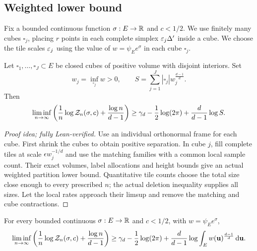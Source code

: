 \documentclass[11pt,letterpaper]{article}
\begin{document}
\subsection{Weighted lower bound}
Fix a bounded continuous function $\sigma:E\to\mathbb R$ and $c<1/2$.
We use finitely many cubes $\square_j$, placing $r$ points in each complete simplex $\varepsilon_j\Delta'$ inside a cube. We choose the tile scales $\varepsilon_{j}$ using the value of $w=\psi_Ee^\sigma$ in each cube $\square_{j}$.


\begin{lemma}\label{lem:cube-lower}
      Let $\square_1,\ldots,\square_J\subset E$ be closed cubes of positive volume with disjoint interiors. Set
      \[
            w_j=\inf_{\square_j}w>0,\qquad S=\sum_{j=1}^J|\square_j|w_j^{\frac{d-1}{d}}.
      \]
      Then
      \begin{equation}\label{eq:lower-rate}
            \liminf_{n\to\infty}\left(\frac1n\log\mathcal Z_n(\sigma,c)+\frac{\log n}{d-1}\right)
            \ge\gamma_d-\frac12\log(2\pi)+\frac d{d-1}\log S.
      \end{equation}
\end{lemma}

\begin{proof}[Proof idea; fully Lean-verified]
Use an individual orthonormal frame for each cube. First shrink the cubes to obtain positive separation. In cube $j$, fill complete tiles at scale $\epsilon w_j^{-1/d}$ and use the matching families with a common local sample count. Their exact volumes, label allocations and height bounds give an actual weighted partition lower bound. Quantitative tile counts choose the total size close enough to every prescribed $n$; the actual deletion inequality supplies all sizes. Let the local rates approach their limsup and remove the matching and cube contractions.
\end{proof}


\begin{lemma}\label{lem:lower}
      For every bounded continuous $\sigma:E\to\mathbb R$ and $c<1/2$, with $w=\psi_Ee^\sigma$,
      \begin{equation}\label{eq:lower-conclusion}
            \liminf_{n\to\infty}\left(\frac1n\log\mathcal Z_n(\sigma,c)+\frac{\log n}{d-1}\right)
            \ge\gamma_d-\frac12\log(2\pi)+\frac d{d-1}\log\int_Ew(\mathbf u)^{\frac{d-1}{d}}\,\mathrm d\mathbf u.
      \end{equation}
\end{lemma}
\end{document}
